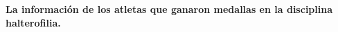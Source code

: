 \textbf{La información de los atletas que ganaron medallas en la disciplina halterofilia.}\vspace{.3cm}